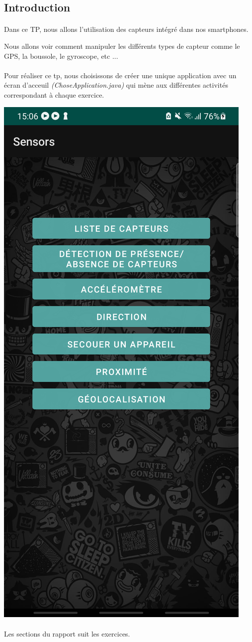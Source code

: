 \documentclass[a4paper]{article}
\begin{document}
    \newpage
    \begin{multicols}{2}
        \section*{Introduction}
        \paragraph{}
            Dans ce TP, nous allons l'utilisation des capteurs intégré dans nos smartphones.
            
            Nous allons voir comment manipuler les différents types de capteur comme le GPS, la boussole, le gyroscope, etc ...
        \paragraph{}
            Pour réaliser ce tp, nous choisissons de créer une unique application avec un écran d'acceuil \emph{(ChoseApplication.java)} qui mène aux différentes activités correspondant à chaque exercice.
            
            \includegraphics[height=.8\textwidth]{screenshot}
        \paragraph{}
            Les sections du rapport suit les exercices.

\end{multicols}
\end{document}
